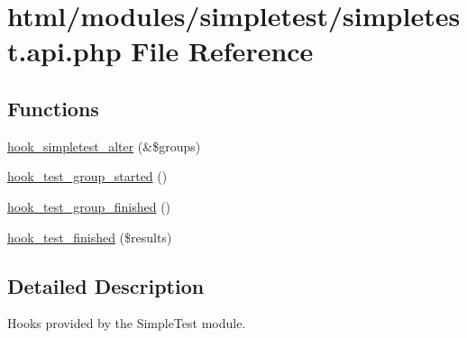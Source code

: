 \hypertarget{simpletest_8api_8php}{
\section{html/modules/simpletest/simpletest.api.php File Reference}
\label{simpletest_8api_8php}
}
\subsection*{Functions}
\begin{DoxyCompactItemize}
\item 
\hyperlink{group__hooks_ga0e2bc56b600a923dff7c800e644e0d4d}{hook\_\-simpletest\_\-alter} (\&\$groups)
\item 
\hyperlink{group__hooks_gaf2cec6422b14cc1d0cace3ee2b26de6d}{hook\_\-test\_\-group\_\-started} ()
\item 
\hyperlink{group__hooks_ga9470b40a0a03f248e7cd9a44930c155e}{hook\_\-test\_\-group\_\-finished} ()
\item 
\hyperlink{group__hooks_gaebaf3196cbd4a76ad40603762443e9c5}{hook\_\-test\_\-finished} (\$results)
\end{DoxyCompactItemize}


\subsection{Detailed Description}
Hooks provided by the SimpleTest module. 